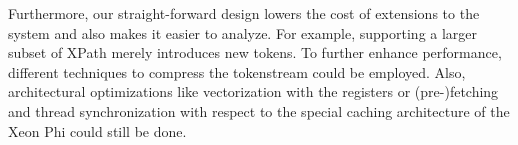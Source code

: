 Furthermore, our straight-forward design lowers the cost of extensions to the
system and also makes it easier to analyze. For example, supporting a larger
subset of XPath merely introduces new tokens. To further enhance
performance, different techniques to compress the tokenstream could be 
employed. Also, architectural optimizations like vectorization with the  
registers or (pre-)fetching and thread synchronization with respect to the special 
caching architecture of the Xeon Phi could still be done.




%
%
%


